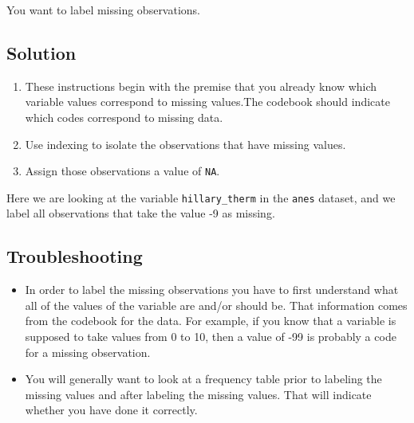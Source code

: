 \documentclass[
]{book}
\newenvironment{Shaded}{\begin{snugshade}}{\end{snugshade}}
\newcommand{\CommentTok}[1]{\textcolor[rgb]{0.56,0.35,0.01}{\textit{#1}}}
\newcommand{\ConstantTok}[1]{\textcolor[rgb]{0.56,0.35,0.01}{#1}}
\newcommand{\DecValTok}[1]{\textcolor[rgb]{0.00,0.00,0.81}{#1}}
\newcommand{\NormalTok}[1]{#1}
\newcommand{\OtherTok}[1]{\textcolor[rgb]{0.56,0.35,0.01}{#1}}
\newcommand{\SpecialCharTok}[1]{\textcolor[rgb]{0.81,0.36,0.00}{\textbf{#1}}}
\providecommand{\tightlist}{%
  \setlength{\itemsep}{0pt}\setlength{\parskip}{0pt}}
\begin{document}
You want to label missing observations.

\hypertarget{solution-14}{%
\subsection{Solution}\label{solution-14}}

\begin{enumerate}
\def\labelenumi{\arabic{enumi}.}
\tightlist
\item
  These instructions begin with the premise that you already know which variable values correspond to missing values.The codebook should indicate which codes correspond to missing data.
\item
  Use indexing to isolate the observations that have missing values.
\item
  Assign those observations a value of \texttt{NA}.
\end{enumerate}

\begin{Shaded}
\end{Shaded}

Here we are looking at the variable \texttt{hillary\_therm} in the \texttt{anes} dataset, and we label all observations that take the value -9 as missing.

\begin{Shaded}
\end{Shaded}

\hypertarget{troubleshooting-11}{%
\subsection{Troubleshooting}\label{troubleshooting-11}}

\begin{itemize}
\tightlist
\item
  In order to label the missing observations you have to first understand what all of the values of the variable are and/or should be. That information comes from the codebook for the data. For example, if you know that a variable is supposed to take values from 0 to 10, then a value of -99 is probably a code for a missing observation.
\item
  You will generally want to look at a frequency table prior to labeling the missing values and after labeling the missing values. That will indicate whether you have done it correctly.
\end{itemize}
\end{document}
